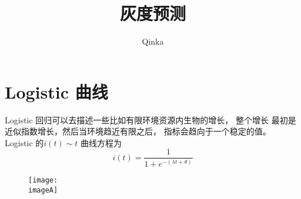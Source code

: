 \documentclass{ctexart}
\author{Qinka}
\title{灰度预测}
\begin{document}
  \maketitle
  \section{Logistic 曲线}
  Logistic 回归可以去描述一些比如有限环境资源内生物的增长，
  整个增长 最初是近似指数增长，然后当环境趋近有限之后，
  指标会趋向于一个稳定的值。
  Logistic 的$i(t)\sim t$ 曲线方程为
  $$i(t)=\frac{1}{1+e^{-(\lambda t+\theta)}}$$
  \ifx \pandoc \undefined
  \def\imageA{../resource/pic/sumo/logistic}
  \else
  \def\imageA{/r/}
  \fi
  \begin{figure}
\centering
\texttt{[image: \\imageA]}
\caption{}
\label{fig:logistic}
\end{figure}
\end{document}
